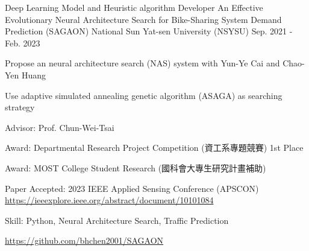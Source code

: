 \begin{cventries}
  \cventry
    {Deep Learning Model and Heuristic algorithm Developer} %
    {An Effective Evolutionary Neural Architecture Search for 
        Bike-Sharing System Demand Prediction (SAGAON)} %
    {National Sun Yat-sen University (NSYSU)} %
    {Sep. 2021 - Feb. 2023} %
    {
        \begin{cvitems} %
            \item {Propose an neural architecture search (NAS) system with Yun-Ye Cai and Chao-Yen Huang}
            \item {Use adaptive simulated annealing genetic algorithm (ASAGA) as searching strategy}
            \item {Advisor: Prof. Chun-Wei-Tsai}
            \item {Award: Departmental Research Project Competition (資工系專題競賽) 1st Place}
            \item {Award: MOST College Student Research (國科會大專生研究計畫補助)}
            \item {Paper Accepted: 2023 IEEE Applied Sensing Conference (APSCON) \\ 
            \url{https://ieeexplore.ieee.org/abstract/document/10101084}}
            \item {Skill: Python, Neural Architecture Search, Traffic Prediction}
            \item {\url{https://github.com/bhchen2001/SAGAON}}
        \end{cvitems}
    }

\end{cventries}
